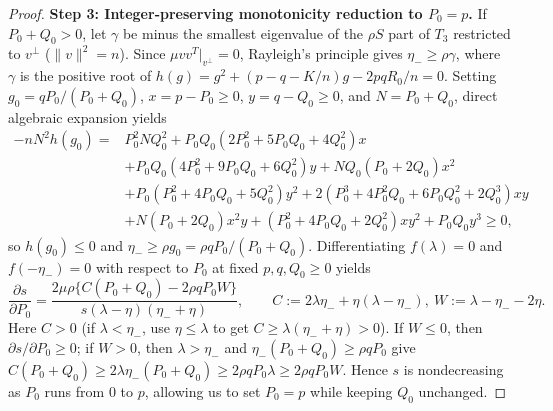 \documentclass[11pt,reqno]{article}
\theoremstyle{definition}
\begin{document}
\begin{proof}
\medskip\noindent\textbf{Step 3: Integer-preserving monotonicity reduction to $P_0 = p$.}
If $P_0 + Q_0 > 0$, let $\gamma$ be minus the smallest eigenvalue of the $\rho S$ part of $T_3$ restricted to $v^\perp$ ($\|v\|^2 = n$). Since $\mu v v^T|_{v^\perp} = 0$, Rayleigh's principle gives $\eta_- \ge \rho\gamma$, where $\gamma$ is the positive root of $h(g) = g^2 + (p - q - K/n)g - 2pq R_0/n = 0$. Setting $g_0 = q P_0/(P_0 + Q_0)$, $x = p - P_0 \ge 0$, $y = q - Q_0 \ge 0$, and $N = P_0 + Q_0$, direct algebraic expansion yields
\begin{align*}
-n N^2 h(g_0) ={}& P_0^2 N Q_0^2
 + P_0 Q_0(2P_0^2 + 5P_0 Q_0 + 4Q_0^2)x \\
&+ P_0 Q_0(4P_0^2 + 9P_0 Q_0 + 6Q_0^2)y
 + N Q_0(P_0 + 2Q_0)x^2 \\
&+ P_0(P_0^2 + 4P_0 Q_0 + 5Q_0^2)y^2
 + 2(P_0^3 + 4P_0^2 Q_0 + 6P_0 Q_0^2 + 2Q_0^3)xy \\
&+ N(P_0 + 2Q_0)x^2 y + (P_0^2 + 4P_0 Q_0 + 2Q_0^2)xy^2 + P_0 Q_0 y^3 \ge 0,
\end{align*}
so $h(g_0) \le 0$ and $\eta_- \ge \rho g_0 = \rho q P_0 / (P_0 + Q_0)$. Differentiating $f(\lambda)=0$ and $f(-\eta_-)=0$ with respect to $P_0$ at fixed $p, q, Q_0 \ge 0$ yields
\[
\frac{\partial s}{\partial P_0} = \frac{2\mu\rho\{C(P_0 + Q_0) - 2\rho q P_0 W\}}{s(\lambda - \eta)(\eta_- + \eta)}, \qquad C := 2\lambda\eta_- + \eta(\lambda - \eta_-),\ W := \lambda - \eta_- - 2\eta.
\]
Here $C > 0$ (if $\lambda < \eta_-$, use $\eta \le \lambda$ to get $C \ge \lambda(\eta_- + \eta) > 0$). If $W \le 0$, then $\partial s / \partial P_0 \ge 0$; if $W > 0$, then $\lambda > \eta_-$ and $\eta_- (P_0 + Q_0) \ge \rho q P_0$ give $C(P_0 + Q_0) \ge 2\lambda \eta_-(P_0 + Q_0) \ge 2\rho q P_0 \lambda \ge 2\rho q P_0 W$. Hence $s$ is nondecreasing as $P_0$ runs from $0$ to $p$, allowing us to set $P_0 = p$ while keeping $Q_0$ unchanged.


\end{proof}
\end{document}
